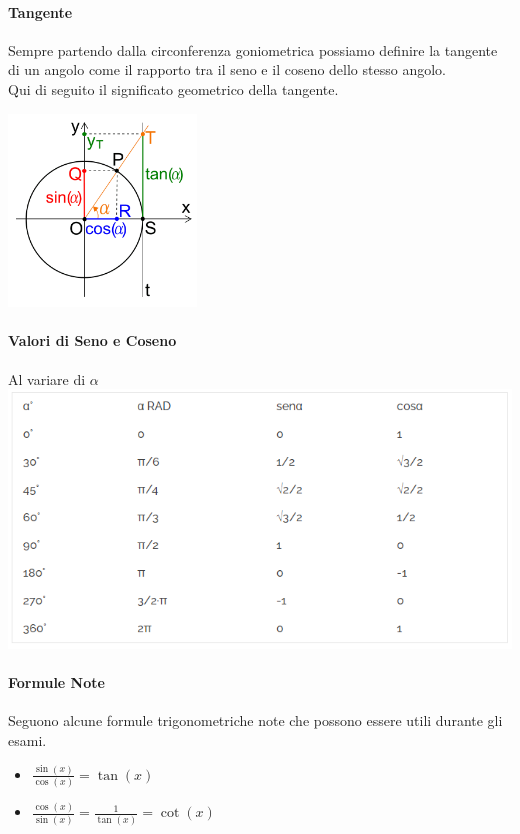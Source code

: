 \documentclass[12pt, a4paper, openany]{book}
\begin{document}
\paragraph*{Tangente} Sempre partendo dalla circonferenza goniometrica possiamo definire la
tangente di un angolo come il rapporto tra il seno e il coseno dello stesso angolo.
\\ Qui di seguito il significato geometrico della tangente.
\begin{center}
	\includegraphics[width=50mm, scale=0.5]{tangente_geom.png}
\end{center}

\paragraph*{Valori di Seno e Coseno} Al variare di $\alpha$
\\\includegraphics[width=\textwidth]{senocoseno.png}

\paragraph*{Formule Note}
Seguono alcune formule trigonometriche note che possono essere utili durante gli esami.
\begin{itemize}
	\item $\frac{\sin(x)}{\cos(x)} = \tan(x)$
	\item $\frac{\cos(x)}{\sin(x)} = \frac{1}{\tan(x)} = \cot(x)$
\end{itemize}
\end{document}
